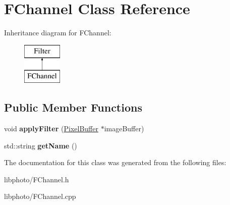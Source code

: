 \hypertarget{classFChannel}{\section{F\-Channel Class Reference}
\label{classFChannel}
}
Inheritance diagram for F\-Channel\-:\begin{figure}[H]
\begin{center}
\leavevmode
\includegraphics[height=2.000000cm]{classFChannel}
\end{center}
\end{figure}
\subsection*{Public Member Functions}
\begin{DoxyCompactItemize}
\item 
\hypertarget{classFChannel_a74a786921c11b3d82119b74f05d3d0c0}{void {\bfseries apply\-Filter} (\hyperlink{classPixelBuffer}{Pixel\-Buffer} $\ast$image\-Buffer)}\label{classFChannel_a74a786921c11b3d82119b74f05d3d0c0}

\item 
\hypertarget{classFChannel_a3d7618565e8643f1a4f87d12a968e406}{std\-::string {\bfseries get\-Name} ()}\label{classFChannel_a3d7618565e8643f1a4f87d12a968e406}

\end{DoxyCompactItemize}


The documentation for this class was generated from the following files\-:\begin{DoxyCompactItemize}
\item 
libphoto/F\-Channel.\-h\item 
libphoto/F\-Channel.\-cpp\end{DoxyCompactItemize}
